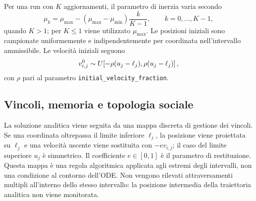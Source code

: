 Per una run con $K$ aggiornamenti, il parametro di inerzia varia secondo
\begin{equation}
  \mu_k=\mu_{\max}-(\mu_{\max}-\mu_{\min})\frac{k}{K-1},
  \qquad k=0,\ldots,K-1,
  \label{eq:inertia-schedule}
\end{equation}
quando $K>1$; per $K\leq1$ viene utilizzato $\mu_{\max}$. Le posizioni iniziali sono campionate uniformemente e indipendentemente per coordinata nell'intervallo ammissibile. Le velocità iniziali seguono
\begin{equation}
  v_{i,j}^0\sim U\!\left[-\rho(u_j-\ell_j),\\
                          \rho(u_j-\ell_j)\right],
  \label{eq:initial-velocity}
\end{equation}
con $\rho$ pari al parametro \texttt{initial\_velocity\_fraction}.

\subsection{Vincoli, memoria e topologia sociale}

La soluzione analitica viene seguita da una mappa discreta di gestione dei vincoli. Se una coordinata oltrepassa il limite inferiore $\ell_j$, la posizione viene proiettata su $\ell_j$ e una velocità uscente viene sostituita con $-e v_{i,j}$; il caso del limite superiore $u_j$ è simmetrico. Il coefficiente $e\in[0,1]$ è il parametro di restituzione. Questa mappa è una regola algoritmica applicata agli estremi degli intervalli, non una condizione al contorno dell'ODE. Non vengono rilevati attraversamenti multipli all'interno dello stesso intervallo: la posizione intermedia della traiettoria analitica non viene monitorata.

